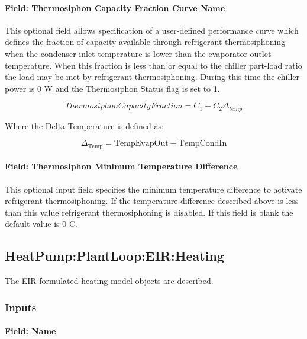 \paragraph{Field: Thermosiphon Capacity Fraction Curve Name}\label{thermosiphon-capacity-fraction-curve-name5}

This optional field allows specification of a user-defined performance curve which defines the fraction of capacity available through refrigerant thermosiphoning when the condenser inlet temperature is lower than the evaporator outlet temperature. When this fraction is less than or equal to the chiller part-load ratio the load may be met by refrigerant thermosiphoning. During this time the chiller power is 0 W and the Thermosiphon Status flag is set to 1.

\begin{equation}
    ThermosiphonCapacityFraction = {C_1} + {C_2}{\Delta_{temp}}
\end{equation}

Where the Delta Temperature is defined as:

\begin{equation}
{\Delta_{{\mathrm{Temp}}}}
    = {\mathrm{TempEvapOut  -  TempCondIn }}
\end{equation}

\paragraph{Field: Thermosiphon Minimum Temperature Difference}\label{thermosiphon-minimum-temperature-difference5}

This optional input field specifies the minimum temperature difference to activate refrigerant thermosiphoning. If the temperature difference described above is less than this value refrigerant thermosiphoning is disabled. If this field is blank the default value is 0 C.

\subsection{HeatPump:PlantLoop:EIR:Heating}\label{plhp_eir_heating}

The EIR-formulated heating model objects are described.

\subsubsection{Inputs}\label{plhp_eir_heating_inputs}

\paragraph{Field: Name}\label{plhp_eir_heating_inputs_name}

